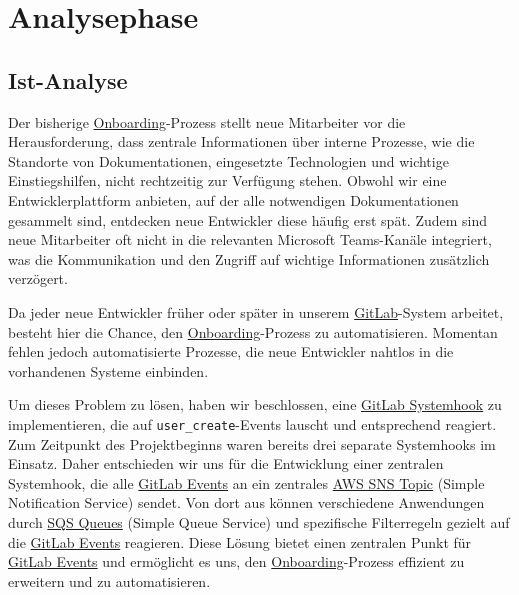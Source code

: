 
\section{Analysephase}
\label{sec:Analysephase}

\subsection{Ist-Analyse}
\label{sec:IstAnalyse}

Der bisherige \hyperlink{Onboarding}{\textcolor{AOBlau}{Onboarding}}-Prozess stellt neue Mitarbeiter vor die Herausforderung, dass zentrale Informationen über interne Prozesse, wie die Standorte von Dokumentationen, eingesetzte Technologien und wichtige Einstiegshilfen, nicht rechtzeitig zur Verfügung stehen. Obwohl wir eine Entwicklerplattform anbieten, auf der alle notwendigen Dokumentationen gesammelt sind, entdecken neue Entwickler diese häufig erst spät. Zudem sind neue Mitarbeiter oft nicht in die relevanten Microsoft Teams-Kanäle integriert, was die Kommunikation und den Zugriff auf wichtige Informationen zusätzlich verzögert.

Da jeder neue Entwickler früher oder später in unserem \hyperlink{GitLab}{\textcolor{AOBlau}{GitLab}}-System arbeitet, besteht hier die Chance, den \hyperlink{Onboarding}{\textcolor{AOBlau}{Onboarding}}-Prozess zu automatisieren. Momentan fehlen jedoch automatisierte Prozesse, die neue Entwickler nahtlos in die vorhandenen Systeme einbinden.

Um dieses Problem zu lösen, haben wir beschlossen, eine \hyperlink{GitLabSystemhooks}{\textcolor{AOBlau}{GitLab Systemhook}} zu implementieren, die auf \texttt{user\_create}-Events lauscht und entsprechend reagiert. Zum Zeitpunkt des Projektbeginns waren bereits drei separate Systemhooks im Einsatz. Daher entschieden wir uns für die Entwicklung einer zentralen Systemhook, die alle \hyperlink{GitLabEvent}{\textcolor{AOBlau}{GitLab Events}} an ein zentrales \hyperlink{SNS}{\textcolor{AOBlau}{AWS SNS Topic}} (Simple Notification Service) sendet. Von dort aus können verschiedene Anwendungen durch \hyperlink{SQS}{\textcolor{AOBlau}{SQS Queues}} (Simple Queue Service) und spezifische Filterregeln gezielt auf die \hyperlink{GitLabEvent}{\textcolor{AOBlau}{GitLab Events}} reagieren. Diese Lösung bietet einen zentralen Punkt für \hyperlink{GitLabEvent}{\textcolor{AOBlau}{GitLab Events}} und ermöglicht es uns, den \hyperlink{Onboarding}{\textcolor{AOBlau}{Onboarding}}-Prozess effizient zu erweitern und zu automatisieren.


